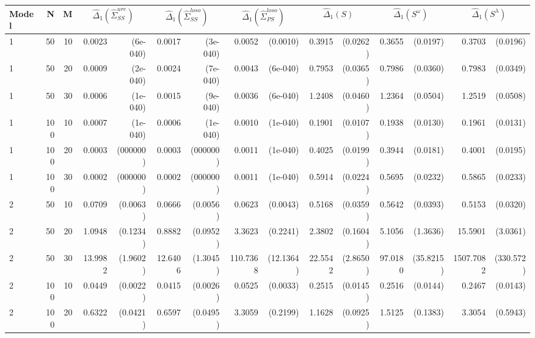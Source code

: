 \begin{table}[ht]
\centering
\begin{small}
\begin{tabular}{lrrrrrrrrrrrrrr}
Model & N & M & \multicolumn{2}{c}{$\hat{\Delta}_1(\hat{\Sigma}^{ure}_{SS})$} &  \multicolumn{2}{c}{$\hat{\Delta}_1(\hat{\Sigma}^{loso}_{SS})$}&  \multicolumn{2}{c}{$\hat{\Delta}_1(\hat{\Sigma}^{loso}_{PS})$} & \multicolumn{2}{c}{$\hat{\Delta}_1(S)$} &  \multicolumn{2}{c}{$\hat{\Delta}_1(S^\omega)$}  &  \multicolumn{2}{c}{$\hat{\Delta}_1(S^\lambda)$}   \\ 
  \hline
1 & 50 & 10 & 0.0023 & (6e-040) & 0.0017 & (3e-040) & 0.0052 & (0.0010) & 0.3915 & (0.0262) & 0.3655 & (0.0197) & 0.3703 & (0.0196) \\ 
  1 & 50 & 20 & 0.0009 & (2e-040) & 0.0024 & (7e-040) & 0.0043 & (6e-040) & 0.7953 & (0.0365) & 0.7986 & (0.0360) & 0.7983 & (0.0349) \\ 
  1 & 50 & 30 & 0.0006 & (1e-040) & 0.0015 & (9e-040) & 0.0036 & (6e-040) & 1.2408 & (0.0460) & 1.2364 & (0.0504) & 1.2519 & (0.0508) \\ 
  1 & 100 & 10 & 0.0007 & (1e-040) & 0.0006 & (1e-040) & 0.0010 & (1e-040) & 0.1901 & (0.0107) & 0.1938 & (0.0130) & 0.1961 & (0.0131) \\ 
  1 & 100 & 20 & 0.0003 & (000000) & 0.0003 & (000000) & 0.0011 & (1e-040) & 0.4025 & (0.0199) & 0.3944 & (0.0181) & 0.4001 & (0.0195) \\ 
  1 & 100 & 30 & 0.0002 & (000000) & 0.0002 & (000000) & 0.0011 & (1e-040) & 0.5914 & (0.0224) & 0.5695 & (0.0232) & 0.5865 & (0.0233) \\ 
  2 & 50 & 10 & 0.0709 & (0.0063) & 0.0666 & (0.0056) & 0.0623 & (0.0043) & 0.5168 & (0.0359) & 0.5642 & (0.0393) & 0.5153 & (0.0320) \\ 
  2 & 50 & 20 & 1.0948 & (0.1234) & 0.8882 & (0.0952) & 3.3623 & (0.2241) & 2.3802 & (0.1604) & 5.1056 & (1.3636) & 15.5901 & (3.0361) \\ 
  2 & 50 & 30 & 13.9982 & (1.9602) & 12.6406 & (1.3045) & 110.7368 & (12.1364) & 22.5542 & (2.8650) & 97.0180 & (35.8215) & 1507.7082 & (330.572) \\ 
  2 & 100 & 10 & 0.0449 & (0.0022) & 0.0415 & (0.0026) & 0.0525 & (0.0033) & 0.2515 & (0.0145) & 0.2516 & (0.0144) & 0.2467 & (0.0143) \\ 
  2 & 100 & 20 & 0.6322 & (0.0421) & 0.6597 & (0.0495) & 3.3059 & (0.2199) & 1.1628 & (0.0925) & 1.5125 & (0.1383) & 3.3054 & (0.5943) \\ 

\end{tabular}
\end{small}
\end{table}

